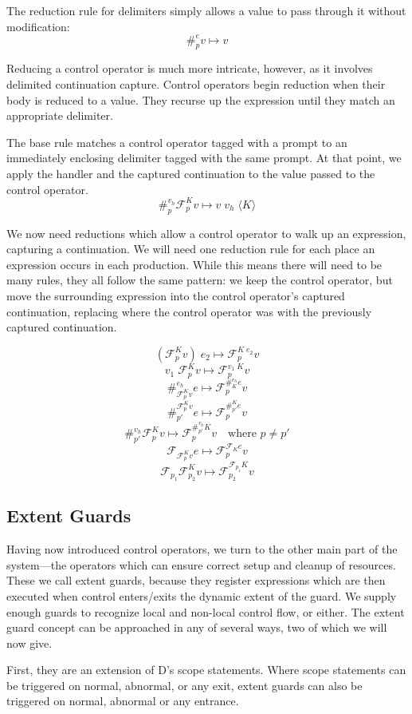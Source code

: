 \documentclass[11pt]{article}
\newcommand{\maybePage}{\newpage}
\newcommand\F{\mathcal{F}}
\newcommand{\angles}[1]{\langle#1\rangle}
\begin{document}
The reduction rule for delimiters simply allows a value to pass through it without modification:
$$\#_p^e v \mapsto v$$

Reducing a control operator is much more intricate, however, as it involves delimited continuation capture.
Control operators begin reduction when their body is reduced to a value.
They recurse up the expression until they match an appropriate delimiter.

The base rule matches a control operator tagged with a prompt to an immediately enclosing delimiter tagged with the same prompt.
At that point, we apply the handler and the captured continuation to the value passed to the control operator.
$$\#_p^{v_h}\F_p^Kv \mapsto v\;v_h\;\angles K$$

We now need reductions which allow a control operator to walk up an expression, capturing a continuation.
We will need one reduction rule for each place an expression occurs in each production.
While this means there will need to be many rules, they all follow the same pattern:
we keep the control operator, but move the surrounding expression into the control operator's captured continuation, replacing where the control operator was with the previously captured continuation.

$$(\F^K_pv)\;e_2 \mapsto \F^{K\;e_2}_pv$$
$$v_1\;\F^K_pv \mapsto \F^{v_1\;K}_pv$$
$$\#_{\F_p^Kv}^{e_h}e \mapsto \F_p^{\#_K^{e_h}e}v$$
$$\#^{\F_p^Kv}_{p'}e \mapsto \F_p^{\#^K_{p'}e}v$$
$$\#_{p'}^{v_h}\F^K_pv \mapsto \F^{\#_{p'}^{v_h}K}_pv
  	\quad\textrm{where }p \neq p'$$
$$\F_{\F^K_pv}e \mapsto \F^{\F_Ke}_pv$$
$$\F_{p_1}\F^K_{p_2}v \mapsto \F^{\F_{p_1}K}_{p_2}v$$

\maybePage
\subsection{Extent Guards}
\label{subsec:extentGuards}

Having now introduced control operators, we turn to the other main part of the system---the operators which can ensure correct setup and cleanup of resources.
These we call extent guards, because they register expressions which are then executed when control enters/exits the dynamic extent of the guard.
We supply enough guards to recognize local and non-local control flow, or either.
The extent guard concept can be approached in any of several ways, two of which we will now give.

First, they are an extension of D's scope statements.
Where scope statements can be triggered on normal, abnormal, or any exit, extent guards can also be triggered on normal, abnormal or any entrance.
\end{document}
